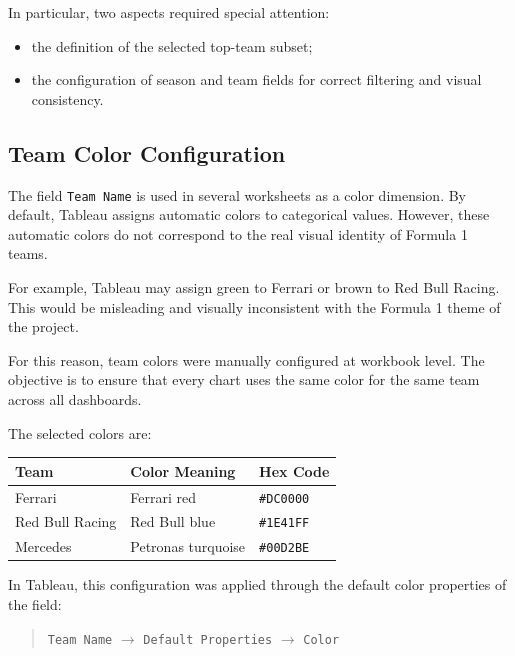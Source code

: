 \documentclass[12pt,a4paper]{article}
\begin{document}
	In particular, two aspects required special attention:
	
	\begin{itemize}[leftmargin=1.2cm]
		\item the definition of the selected top-team subset;
		\item the configuration of season and team fields for correct filtering and visual consistency.
	\end{itemize}
	
	
	\subsection{Team Color Configuration}
	
	The field \texttt{Team Name} is used in several worksheets as a color dimension.
	By default, Tableau assigns automatic colors to categorical values.
	However, these automatic colors do not correspond to the real visual identity of Formula 1 teams.
	
	For example, Tableau may assign green to Ferrari or brown to Red Bull Racing.
	This would be misleading and visually inconsistent with the Formula 1 theme of the project.
	
	For this reason, team colors were manually configured at workbook level.
	The objective is to ensure that every chart uses the same color for the same team across all dashboards.
	
	The selected colors are:
	
	\begin{longtable}{p{5cm} p{4cm} p{4cm}}
		\toprule
		\textbf{Team} & \textbf{Color Meaning} & \textbf{Hex Code} \\
		\midrule
		Ferrari & Ferrari red & \texttt{\#DC0000} \\
		Red Bull Racing & Red Bull blue & \texttt{\#1E41FF} \\
		Mercedes & Petronas turquoise & \texttt{\#00D2BE} \\
		\bottomrule
	\end{longtable}
	
	In Tableau, this configuration was applied through the default color properties of the field:
	
	\begin{quote}
		\texttt{Team Name} $\rightarrow$ \texttt{Default Properties} $\rightarrow$ \texttt{Color}
	\end{quote}
	
\end{document}
